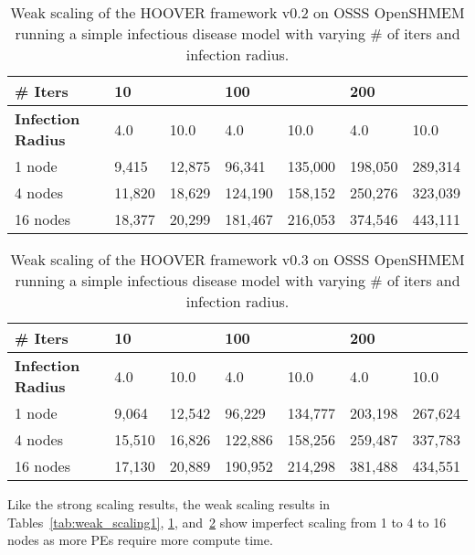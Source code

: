 \begin{table}
\centering
\begin{tabularx}{\textwidth}{ | l || X | X | X | X | X | X | }
\hline
\textbf{\# Iters}           & \multicolumn{2}{|X|}{\textbf{10}} & \multicolumn{2}{|X|}{\textbf{100}} & \multicolumn{2}{|X|}{\textbf{200}} \\\hline
\textbf{Infection Radius}   & 4.0          & 10.0         & 4.0           & 10.0          & 4.0           & 10.0 \\\hline
1 node                      & 9,415  & 12,875 & 96,341  & 135,000 & 198,050 & 289,314 \\\hline
4 nodes                     & 11,820 & 18,629 & 124,190 & 158,152 & 250,276 & 323,039 \\\hline
16 nodes                    & 18,377 & 20,299 & 181,467 & 216,053 & 374,546 & 443,111 \\\hline
\end{tabularx}
\caption{Weak scaling of the HOOVER framework v0.2 on OSSS OpenSHMEM running a
    simple infectious disease model with varying \# of iters and infection
    radius.}
\label{tab:weak_scaling2}
\end{table}

\begin{table}
\centering
\begin{tabularx}{\textwidth}{ | l || X | X | X | X | X | X | }
\hline
\textbf{\# Iters}           & \multicolumn{2}{|X|}{\textbf{10}} & \multicolumn{2}{|X|}{\textbf{100}} & \multicolumn{2}{|X|}{\textbf{200}} \\\hline
\textbf{Infection Radius}   & 4.0          & 10.0         & 4.0           & 10.0          & 4.0           & 10.0 \\\hline
1 node                      &  9,064 & 12,542 &  96,229 & 134,777 & 203,198 & 267,624 \\\hline
4 nodes                     & 15,510 & 16,826 & 122,886 & 158,256 & 259,487 & 337,783 \\\hline
16 nodes                    & 17,130 & 20,889 & 190,952 & 214,298 & 381,488 & 434,551 \\\hline
\end{tabularx}
\caption{Weak scaling of the HOOVER framework v0.3 on OSSS OpenSHMEM running a
    simple infectious disease model with varying \# of iters and infection
    radius.}
\label{tab:weak_scaling3}
\end{table}

Like the strong scaling results, the weak scaling results in
Tables~\ref{tab:weak_scaling1}, \ref{tab:weak_scaling2},
and~\ref{tab:weak_scaling3} show imperfect scaling from 1 to 4 to 16 nodes as
more PEs require more compute time.

